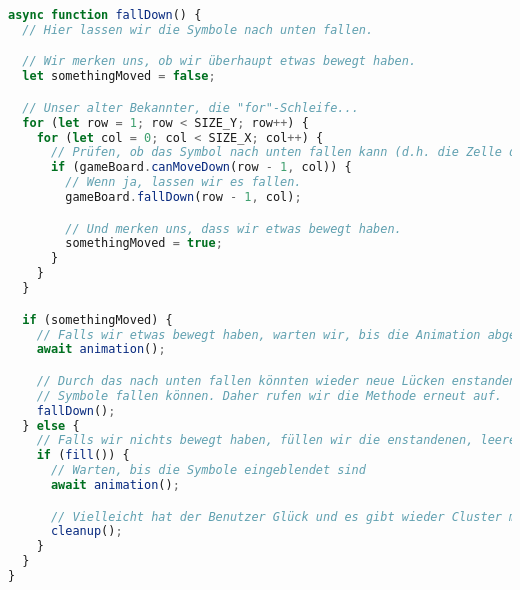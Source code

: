 \documentclass{article}
\begin{document}
    \newpage



    \begin{lstlisting}[language=JavaScript]
async function fallDown() {
  // Hier lassen wir die Symbole nach unten fallen.

  // Wir merken uns, ob wir überhaupt etwas bewegt haben.
  let somethingMoved = false;

  // Unser alter Bekannter, die "for"-Schleife...
  for (let row = 1; row < SIZE_Y; row++) {
    for (let col = 0; col < SIZE_X; col++) {
      // Prüfen, ob das Symbol nach unten fallen kann (d.h. die Zelle darunter ist leer)
      if (gameBoard.canMoveDown(row - 1, col)) {
        // Wenn ja, lassen wir es fallen.
        gameBoard.fallDown(row - 1, col);

        // Und merken uns, dass wir etwas bewegt haben.
        somethingMoved = true;
      }
    }
  }

  if (somethingMoved) {
    // Falls wir etwas bewegt haben, warten wir, bis die Animation abgeschlossen ist
    await animation();

    // Durch das nach unten fallen könnten wieder neue Lücken enstanden sein, in die
    // Symbole fallen können. Daher rufen wir die Methode erneut auf.
    fallDown();
  } else {
    // Falls wir nichts bewegt haben, füllen wir die enstandenen, leeren Zellen neu auf.
    if (fill()) {
      // Warten, bis die Symbole eingeblendet sind
      await animation();

      // Vielleicht hat der Benutzer Glück und es gibt wieder Cluster mit mehr als 3 Symbolen.
      cleanup();
    }
  }
}
    \end{lstlisting}

    \vspace{0.5cm}

    
    \newpage
\end{document}
